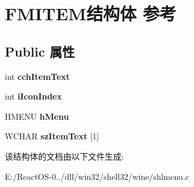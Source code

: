 \hypertarget{struct_f_m_i_t_e_m}{}\section{F\+M\+I\+T\+E\+M结构体 参考}
\label{struct_f_m_i_t_e_m}
\subsection*{Public 属性}
\begin{DoxyCompactItemize}
\item 
\mbox{\label{struct_f_m_i_t_e_m_a341a987e4382503ff465802811029f4c}} 
int {\bfseries cch\+Item\+Text}
\item 
\mbox{\label{struct_f_m_i_t_e_m_a6af95e01ba64feceab6df0e6401b3911}} 
int {\bfseries i\+Icon\+Index}
\item 
\mbox{\label{struct_f_m_i_t_e_m_aac93e3f8c5950678363de830679a9c36}} 
H\+M\+E\+NU {\bfseries h\+Menu}
\item 
\mbox{\label{struct_f_m_i_t_e_m_ae12484017b0b71ab9fd4ab886b1b6b03}} 
W\+C\+H\+AR {\bfseries sz\+Item\+Text} \mbox{[}1\mbox{]}
\end{DoxyCompactItemize}


该结构体的文档由以下文件生成\+:\begin{DoxyCompactItemize}
\item 
E\+:/\+React\+O\+S-\/0../dll/win32/shell32/wine/shlmenu.\+c\end{DoxyCompactItemize}
